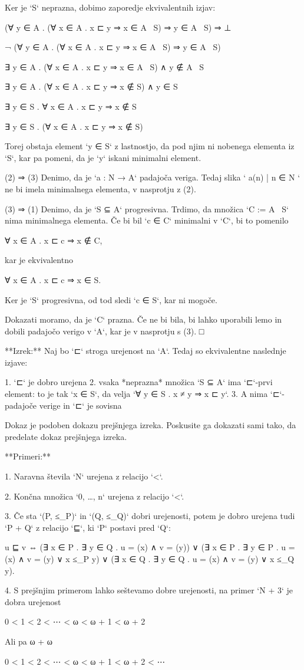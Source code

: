 Ker je `S` neprazna, dobimo zaporedje ekvivalentnih izjav:

     (∀ y ∈ A . (∀ x ∈ A . x ⊏ y ⇒ x ∈ A \ S) ⇒ y ∈ A \ S) ⇒ ⊥

     ¬ (∀ y ∈ A . (∀ x ∈ A . x ⊏ y ⇒ x ∈ A \ S) ⇒ y ∈ A \ S)

     ∃ y ∈ A . (∀ x ∈ A . x ⊏ y ⇒ x ∈ A \ S) ∧ y ∉ A \ S

     ∃ y ∈ A . (∀ x ∈ A . x ⊏ y ⇒ x ∉ S) ∧ y ∈ S

     ∃ y ∈ S . ∀ x ∈ A . x ⊏ y ⇒ x ∉ S

     ∃ y ∈ S . (∀ x ∈ A . x ⊏ y ⇒ x ∉ S)

Torej obstaja element `y ∈ S` z lastnostjo, da pod njim ni nobenega elementa iz
`S`, kar pa pomeni, da je `y` iskani minimalni element.

(2) ⇒ (3) Denimo, da je `a : N → A` padajoča veriga. Tedaj slika `{ a(n) | n ∈ N }` ne bi imela
minimalnega elementa, v nasprotju z (2).

(3) ⇒ (1) Denimo, da je `S ⊆ A` progresivna. Trdimo, da množica `C := A \ S` nima
minimalnega elementa. Če bi bil `c ∈ C` minimalni v `C`, bi to pomenilo

    ∀ x ∈ A . x ⊏ c ⇒ x ∉ C,

kar je ekvivalentno

    ∀ x ∈ A . x ⊏ c ⇒ x ∈ S.

Ker je `S` progresivna, od tod sledi `c ∈ S`, kar ni mogoče.

Dokazati moramo, da je `C` prazna. Če ne bi bila, bi lahko uporabili lemo in dobili padajočo
verigo v `A`, kar je v nasprotju s (3). □

**Izrek:** Naj bo `⊏` stroga urejenost na `A`. Tedaj so ekvivalentne naslednje izjave:

1. `⊏` je dobro urejena
2. vsaka *neprazna* množica `S ⊆ A` ima `⊏`-prvi element: to je tak `x ∈ S`, da velja
   `∀ y ∈ S . x ≠ y ⇒ x ⊏ y`.
3. A nima `⊏`-padajoče verige in `⊏` je sovisna

Dokaz je podoben dokazu prejšnjega izreka. Poskusite ga dokazati sami tako, da predelate
dokaz prejšnjega izreka.

**Primeri:**

1. Naravna števila `N` urejena z relacijo `<`.

2. Končna množica `{0, …, n}` urejena z relacijo `<`.

3. Če sta `(P, ≤_P)` in `(Q, ≤_Q)` dobri urejenosti, potem je dobro urejena tudi
   `P + Q` z relacijo `⊑`, ki `P` postavi pred `Q`:

        u ⊑ v ⇔
         (∃ x ∈ P . ∃ y ∈ Q . u = \inl(x) ∧ v = \inr(y)) ∨
         (∃ x ∈ P . ∃ y ∈ P . u = \inl(x) ∧ v = \inl(y) ∨ x ≤_P y) ∨
         (∃ x ∈ Q . ∃ y ∈ Q . u = \inr(x) ∧ v = \inr(y) ∨ x ≤_Q y).

4. S prejšnjim primerom lahko seštevamo dobre urejenosti, na primer `N + 3` je dobra
   urejenost

        0 < 1 < 2 < ⋯ < ω < ω + 1 < ω + 2

    Ali pa ω + ω

        0 < 1 < 2 < ⋯ < ω < ω + 1 < ω + 2 < ⋯
